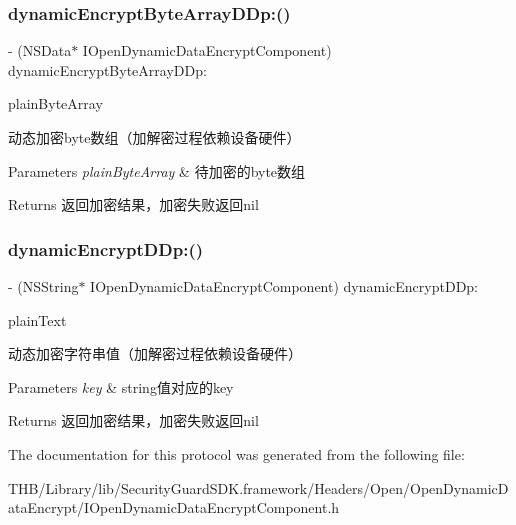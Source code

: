 \subsubsection{\texorpdfstring{dynamic\+Encrypt\+Byte\+Array\+D\+Dp\+:()}{dynamicEncryptByteArrayDDp:()}}
{\footnotesize\ttfamily -\/ (N\+S\+Data$\ast$ I\+Open\+Dynamic\+Data\+Encrypt\+Component) dynamic\+Encrypt\+Byte\+Array\+D\+Dp\+: \begin{DoxyParamCaption}\item[{(N\+S\+Data $\ast$)}]{plain\+Byte\+Array }\end{DoxyParamCaption}}

动态加密byte数组（加解密过程依赖设备硬件）


\begin{DoxyParams}{Parameters}
{\em plain\+Byte\+Array} & 待加密的byte数组\\
\hline
\end{DoxyParams}
\begin{DoxyReturn}{Returns}
返回加密结果，加密失败返回nil 
\end{DoxyReturn}
\mbox{\label{protocol_i_open_dynamic_data_encrypt_component_01-p_aec61b5430eb3d1aa60d5e1ec986f4340}} 
\subsubsection{\texorpdfstring{dynamic\+Encrypt\+D\+Dp\+:()}{dynamicEncryptDDp:()}}
{\footnotesize\ttfamily -\/ (N\+S\+String$\ast$ I\+Open\+Dynamic\+Data\+Encrypt\+Component) dynamic\+Encrypt\+D\+Dp\+: \begin{DoxyParamCaption}\item[{(N\+S\+String $\ast$)}]{plain\+Text }\end{DoxyParamCaption}}

动态加密字符串值（加解密过程依赖设备硬件）


\begin{DoxyParams}{Parameters}
{\em key} & string值对应的key\\
\hline
\end{DoxyParams}
\begin{DoxyReturn}{Returns}
返回加密结果，加密失败返回nil 
\end{DoxyReturn}


The documentation for this protocol was generated from the following file\+:\begin{DoxyCompactItemize}
\item 
T\+H\+B/\+Library/lib/\+Security\+Guard\+S\+D\+K.\+framework/\+Headers/\+Open/\+Open\+Dynamic\+Data\+Encrypt/I\+Open\+Dynamic\+Data\+Encrypt\+Component.\+h\end{DoxyCompactItemize}
